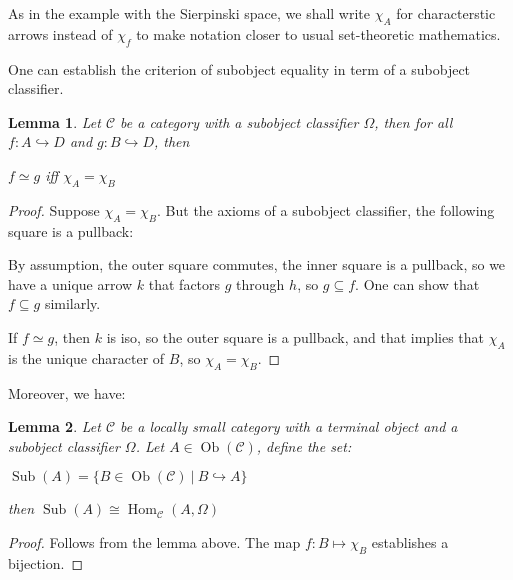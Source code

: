 \documentclass[a4paper]{article}
\theoremstyle{defin}
\theoremstyle{theorem}
\theoremstyle{claim}
\theoremstyle{prop}
\theoremstyle{lemma}
\newtheorem{lemma}{Lemma}
\theoremstyle{fact}
\theoremstyle{ex}
\theoremstyle{col}
\begin{document}
As in the example with the Sierpinski space, we shall write $\chi_A$ for characterstic arrows instead of $\chi_f$ to make notation closer to usual set-theoretic mathematics.

One can establish the criterion of subobject equality in term of a subobject classifier.

\begin{lemma}

Let $\mathcal{C}$ be a category with a subobject classifier $\Omega$, then for all $f : A \hookrightarrow D$ and $g : B \hookrightarrow D$, then

\begin{center}
$f \simeq g$ iff $\chi_A = \chi_B$
\end{center}

\end{lemma}

\begin{proof}
Suppose $\chi_A = \chi_B$. But the axioms of a subobject classifier, the following square is a pullback:

\centerline{
}

By assumption, the outer square commutes, the inner square is a pullback, so we have a unique arrow $k$ that factors $g$ through $h$, so $g \subseteq f$. One can show that $f \subseteq g$ similarly.

If $f \simeq g$, then $k$ is iso, so the outer square is a pullback, and that implies that $\chi_A$ is the unique character of $B$, so $\chi_A = \chi_B$.
\end{proof}

Moreover, we have:
\begin{lemma}
Let $\mathcal{C}$ be a locally small category with a terminal object and a subobject classifier $\Omega$. Let $A \in \operatorname{Ob}(\mathcal{C})$, define the set:

\begin{center}
$\operatorname{Sub}(A) = \{ B \in \operatorname{Ob}(\mathcal{C}) \: | \: B \hookrightarrow A \}$
\end{center}

then $\operatorname{Sub}(A) \cong \operatorname{Hom}_{\mathcal{C}}(A, \Omega)$
\end{lemma}

\begin{proof}
Follows from the lemma above. The map $f : B \mapsto \chi_B$ establishes a bijection.
\end{proof}
\end{document}
